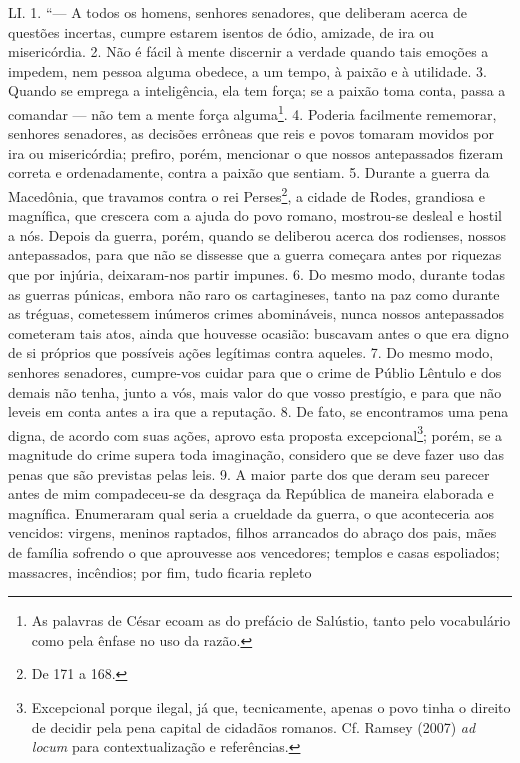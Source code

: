 LI. 1. ``--- A todos os homens, senhores senadores, que deliberam acerca de
questões incertas, cumpre estarem isentos de ódio, amizade, de ira ou
misericórdia. 2. Não é fácil à mente discernir a verdade quando tais emoções a
impedem, nem pessoa alguma obedece, a um tempo, à paixão e à utilidade. 3.
Quando se emprega a inteligência, ela tem força; se a paixão toma conta, passa
a comandar --- não tem a mente força alguma\footnote{As palavras de César ecoam
as do prefácio de Salústio, tanto pelo vocabulário como pela ênfase no uso da
razão.}. 4. Poderia facilmente rememorar, senhores senadores, as decisões
errôneas que reis e povos tomaram movidos por ira ou misericórdia; prefiro,
porém, mencionar o que nossos antepassados fizeram correta e ordenadamente,
contra a paixão que sentiam. 5. Durante a guerra da Macedônia, que travamos
contra o rei Perses\footnote{De 171 a 168.}, a cidade de Rodes, grandiosa e
magnífica, que crescera com a ajuda do povo romano, mostrou-se desleal e hostil
a nós. Depois da guerra, porém, quando se deliberou acerca dos rodienses,
nossos antepassados, para que não se dissesse que a guerra começara antes por
riquezas que por injúria, deixaram-nos partir impunes. 6. Do mesmo modo,
durante todas as guerras púnicas, embora não raro os cartagineses, tanto na paz
como durante as tréguas, cometessem inúmeros crimes abomináveis, nunca nossos
antepassados cometeram tais atos, ainda que houvesse ocasião: buscavam antes o
que era digno de si próprios que possíveis ações legítimas contra aqueles. 7.
Do mesmo modo, senhores senadores, cumpre-vos cuidar para que o crime de
Públio Lêntulo e dos demais não tenha, junto a vós, mais valor do que vosso
prestígio, e para que não leveis em conta antes a ira que a reputação. 8. De
fato, se encontramos uma pena digna, de acordo com suas ações, aprovo esta
proposta excepcional\footnote{Excepcional porque ilegal, já que, tecnicamente,
apenas o povo tinha o direito de decidir pela pena capital de cidadãos romanos.
Cf. Ramsey (2007) \emph{ad locum} para contextualização e referências.}; porém,
se a magnitude do crime supera toda imaginação, considero que se deve fazer uso
das penas que são previstas pelas leis. 9. A maior parte dos que deram seu
parecer antes de mim compadeceu-se da desgraça da República de maneira
elaborada e magnífica. Enumeraram qual seria a crueldade da guerra, o que
aconteceria aos vencidos: virgens, meninos raptados, filhos arrancados do
abraço dos pais, mães de família sofrendo o que aprouvesse aos vencedores;
templos e casas espoliados; massacres, incêndios; por fim, tudo ficaria repleto
